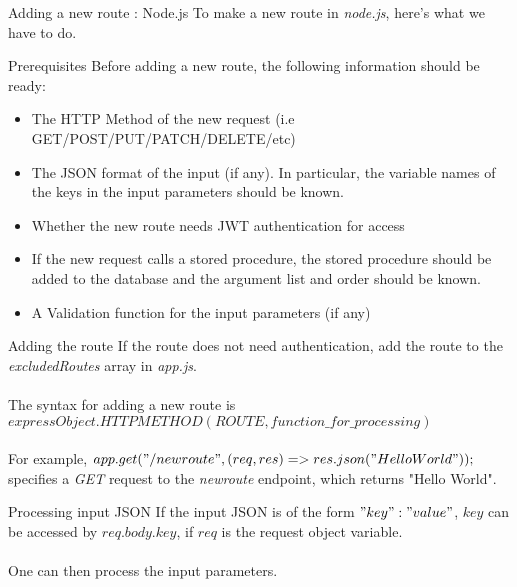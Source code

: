 \documentclass[
10pt, %
a4paper, %
oneside, %
headinclude,footinclude, %
BCOR5mm, %
]{scrartcl}
\begin{document}
\newpage

\begin{section}{Adding a new route : Node.js}
To make a new route in \textit{node.js}, here's what we have to do. \\ 
\begin{subsection}{Prerequisites}
Before adding a new route, the following information should be ready:
\begin{itemize}
    \item The HTTP Method of the new request (i.e GET/POST/PUT/PATCH/DELETE/etc)
    \item The JSON format of the input (if any). In particular, the variable names of the keys in the input parameters should be known.
    \item Whether the new route needs JWT authentication for access
    \item If the new request calls a stored procedure, the stored procedure should be added to the database and the argument list and order should be known.
    \item A Validation function for the input parameters (if any)
\end{itemize}
\end{subsection}

\begin{subsection}{Adding the route}
If the route does not need authentication, add the route to the \textit{excludedRoutes} array in \textit{app.js}. \\ \\
The syntax for adding a new route is $expressObject.HTTPMETHOD (ROUTE, function\_for\_processing)$ \\ \\
For example, $app.get("/newroute",(req,res) => {res.json("Hello World")});$ \\ specifies a \textit{GET} request to the \textit{newroute} endpoint, which returns "Hello World".
\end{subsection}

\begin{subsection}{Processing input JSON}
If the input JSON is of the form $"key":"value"$, $key$ can be accessed by $req.body.key$, if $req$ is the request object variable. \\ \\
One can then process the input parameters.
\end{subsection}


\end{section}
\end{document}
